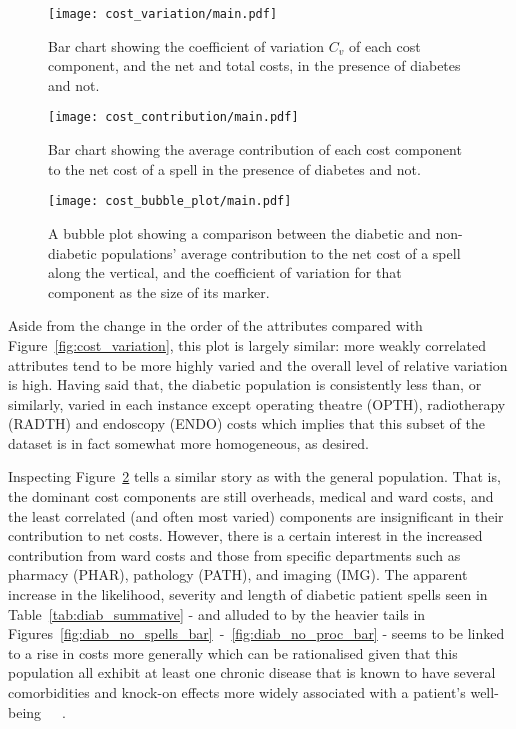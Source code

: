 \begin{figure}[h]
    \centering
    \texttt{[image: cost\_variation/main.pdf]}
    \caption{Bar chart showing the coefficient of variation \(C_{v}\) of each
        cost component, and the net and total costs, in the presence of diabetes
        and not.}%
    \label{fig:diab_variation}
\end{figure}

\begin{figure}[h]
    \centering
    \texttt{[image: cost\_contribution/main.pdf]}
    \caption{Bar chart showing the average contribution of each cost component
        to the net cost of a spell in the presence of diabetes and not.}%
    \label{fig:diab_contribution}
\end{figure}

\begin{figure}[h]
    \centering
    \texttt{[image: cost\_bubble\_plot/main.pdf]}
    \caption{A bubble plot showing a comparison between the diabetic and
        non-diabetic populations' average contribution to the net cost of a
        spell along the vertical, and the coefficient of variation for that
        component as the size of its marker.}%
    \label{fig:diab_bubble_plot}
\end{figure}

Aside from the change in the order of the attributes compared with
Figure~\ref{fig:cost_variation}, this plot is largely similar: more weakly
correlated attributes tend to be more highly varied and the overall level of
relative variation is high. Having said that, the diabetic population is
consistently less than, or similarly, varied in each instance except operating
theatre (OPTH), radiotherapy (RADTH) and endoscopy (ENDO) costs which implies
that this subset of the dataset is in fact somewhat more homogeneous, as
desired.

Inspecting Figure~\ref{fig:diab_contribution} tells a similar story as with the
general population. That is, the dominant cost components are still overheads,
medical and ward costs, and the least correlated (and often most varied)
components are insignificant in their contribution to net costs. However, there
is a certain interest in the increased contribution from ward costs and those
from specific departments such as pharmacy (PHAR), pathology (PATH), and imaging
(IMG). The apparent increase in the likelihood, severity and length of diabetic
patient spells seen in Table~\ref{tab:diab_summative} \-- and alluded to by the
heavier tails in
Figures~\ref{fig:diab_no_spells_bar}~\--~\ref{fig:diab_no_proc_bar} \-- seems to
be linked to a rise in costs more generally which can be rationalised given
that this population all exhibit at least one chronic disease that is known to
have several comorbidities and knock-on effects more widely associated with a
patient's well-being~\cite{Deschenes2015}~\cite{Klimek2015}~\cite{Walker2016}.

